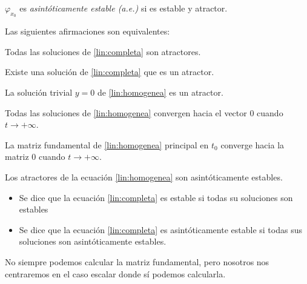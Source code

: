 \begin{ndef}
 $\varphi_{x_0}$ es \emph{asintóticamente estable (a.e.)} si es estable y atractor.
\end{ndef}



\begin{nprop}
Las siguientes afirmaciones son equivalentes:
\begin{nlist}
\item Todas las soluciones de \ref{lin:completa} son atractores.
\item Existe una solución de \ref{lin:completa} que es un atractor.
\item La solución trivial $y = 0$ de \ref{lin:homogenea} es un atractor.
\item Todas las soluciones de \ref{lin:homogenea} convergen hacia el vector 0 cuando $t \to +\infty$.
\item La matriz fundamental de \ref{lin:homogenea} principal en $t_0$ converge hacia la matriz 0 cuando $t \to +\infty$.
\end{nlist}
\end{nprop}

\begin{ncor}
Los atractores de la ecuación \ref{lin:homogenea} son asintóticamente estables.
\end{ncor}

\begin{ndef}
\begin{itemize}
\item Se dice que la ecuación \ref{lin:completa} es estable si todas su soluciones son estables
\item Se dice que la ecuación \ref{lin:completa} es asintóticamente estable si todas sus soluciones son asintóticamente estables.
\end{itemize}
\end{ndef}

No siempre podemos calcular la matriz fundamental, pero nosotros nos centraremos en el caso escalar donde sí podemos calcularla.

